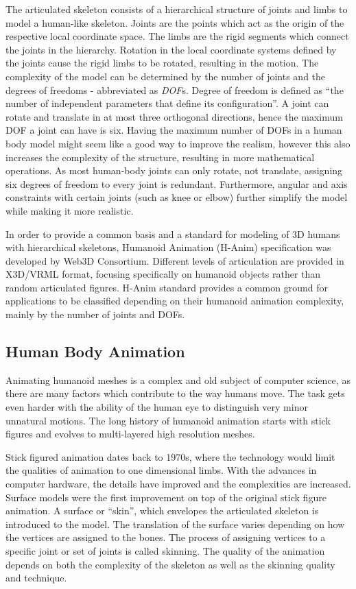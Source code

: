 The articulated skeleton consists of a hierarchical structure of joints and limbs to model a human-like skeleton. Joints are the points which act as the origin of the respective 
local coordinate space. The limbs are the rigid segments which connect the joints in the hierarchy. Rotation in the local coordinate systems defined by the joints cause the rigid
limbs to be rotated, resulting in the motion. The complexity of the model can be determined by the number of joints and the degrees of freedoms - abbreviated as \textit{DOF}s.
Degree of freedom is defined as ``the number of independent parameters that define its configuration''\cite{Lazard2013}. A joint can rotate and translate in at most three orthogonal
directions, hence the maximum DOF a joint can have is six. Having the maximum number of DOFs in a human body model might seem like a good way to improve the realism, 
however this also increases the complexity of the structure, resulting in more mathematical operations. As most human-body joints can only rotate, not translate, assigning six 
degrees of freedom to every joint is redundant. Furthermore, angular and axis constraints with certain joints (such as knee or elbow) further simplify the model while making it 
more realistic. 

In order to provide a common basis and a standard for modeling of 3D humans with hierarchical skeletons, Humanoid Animation (H-Anim) specification was developed by 
Web3D Consortium\cite{HANIM}. Different levels of articulation are provided in X3D/VRML format, focusing specifically on humanoid objects rather than random 
articulated figures. H-Anim standard provides a common ground for applications to be classified depending on their humanoid animation complexity, mainly by the 
number of joints and DOFs. 

\subsection{Human Body Animation}
\label{section_related_human_body_animation}

Animating humanoid meshes is a complex and old subject of computer science, as there are many factors which contribute to the way humans move. The task gets 
even harder with the ability of the human eye to distinguish very minor unnatural motions. The long history of humanoid animation starts with stick figures 
and evolves to multi-layered high resolution meshes. 

Stick figured animation dates back to 1970s, where the technology would limit the qualities of animation to one dimensional limbs\cite{Badler1979}.
With the advances in computer hardware, the details have improved and the complexities are increased. Surface models were the first improvement on top 
of the original stick figure animation. A surface or ``skin'', which envelopes the articulated skeleton is 
introduced to the model. The translation of the surface varies depending on how the vertices are assigned to the bones. The process of assigning vertices to 
a specific joint or set of joints is called skinning. The quality of the animation depends on both the complexity of the skeleton as well as the skinning 
quality and technique. 

